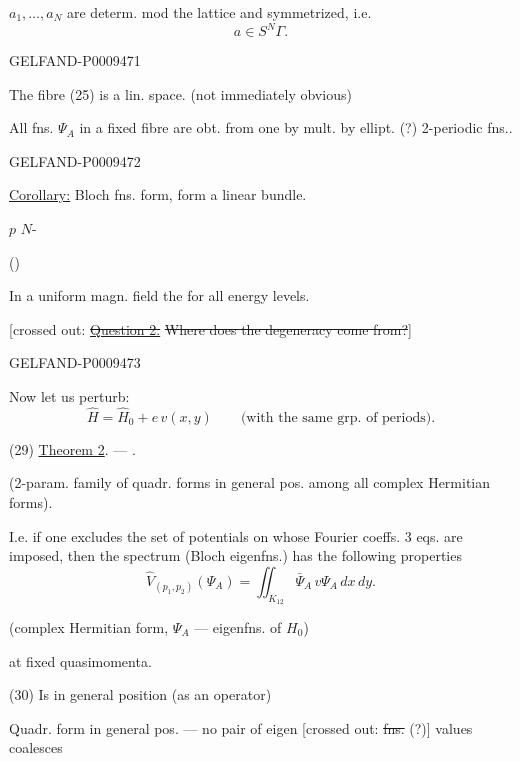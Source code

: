 $a_1,\ldots,a_N$ are determ. mod the lattice and symmetrized, i.e.
\[
 a\in S^N\Gamma.
\]

\begin{GelfandAdjacentEvidence}{GELFAND-P000947}{1}

The fibre (25) is a lin. space. (not immediately obvious)

All fns. $\Psi_A$ in a fixed fibre are obt. from one by mult. by ellipt. (?) 2-periodic fns..
\end{GelfandAdjacentEvidence}
\begin{GelfandAdjacentEvidence}{GELFAND-P000947}{2}


\underline{Corollary:} Bloch fns. form, form a linear bundle.

 $p$  $N$-

()

In a uniform magn. field the  for all energy levels.

[crossed out: \underline{\sout{Question 2.}} \sout{Where does the degeneracy come from?}]
\end{GelfandAdjacentEvidence}
\begin{GelfandAdjacentEvidence}{GELFAND-P000947}{3}


Now let us perturb:
\begin{equation*}
 \hat H=\hat H_0+e\,v(x,y)\qquad\text{(with the same grp. of periods).}
 \tag{28}
\end{equation*}

(29) \underline{Theorem 2}.  --- .

(2-param. family of quadr. forms in general pos. among all complex Hermitian forms).

I.e. if one excludes the set of potentials on whose Fourier coeffs. 3 eqs. are imposed, then the spectrum (Bloch eigenfns.) has the following properties
\begin{equation*}
 \hat V_{(p_1,p_2)}(\Psi_A)=\iint_{K_{12}}\bar\Psi_A\,v\Psi_A\,dx\,dy.
 \tag{30}
\end{equation*}

(complex Hermitian form, $\Psi_A$ --- eigenfns. of $H_0$)

at fixed quasimomenta.

(30) Is in general position (as an operator)

Quadr. form in general pos. --- no pair of eigen [crossed out: \sout{fns.} (?)] values coalesces
\end{GelfandAdjacentEvidence}
